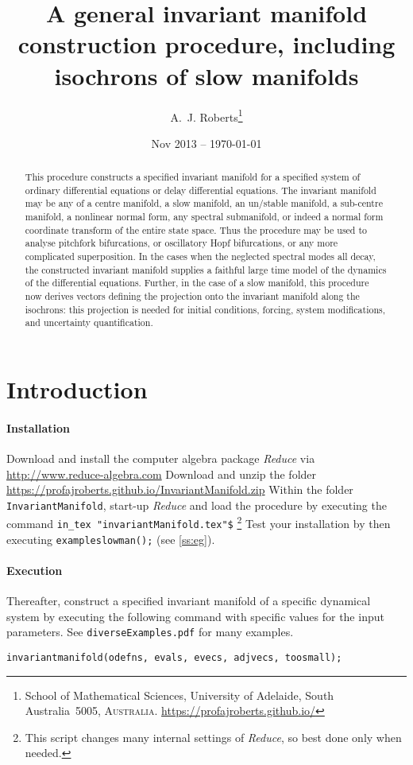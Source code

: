 \documentclass[11pt,a5paper]{article}
\title{A general invariant manifold construction procedure,
including isochrons of slow manifolds}
\author{A.~J. Roberts\thanks{School of Mathematical
Sciences, University of Adelaide, South Australia~5005,
\textsc{Australia}. \url{https://profajroberts.github.io/}}}
\date{Nov 2013 -- \today}
\begin{document}
\sloppy

\maketitle

\begin{abstract}
This procedure constructs a specified invariant manifold for
a specified system of ordinary differential equations or
delay differential equations. The invariant manifold may be
any of a centre manifold, a slow manifold, an un/stable
manifold, a sub-centre manifold, a nonlinear normal form,
any spectral submanifold, or indeed a normal form coordinate
transform of the entire state space. Thus the procedure may
be used to analyse pitchfork bifurcations, or oscillatory
Hopf bifurcations, or any more complicated superposition. In
the cases when the neglected spectral modes all decay, the
constructed invariant manifold supplies a faithful large
time model of the dynamics of the differential equations.
Further, in the case of a slow manifold, this procedure now
derives vectors defining the projection onto the invariant
manifold along the isochrons: this projection is needed for
initial conditions, forcing, system modifications, and
uncertainty quantification.
\end{abstract}

\tableofcontents



\section{Introduction}

\paragraph{Installation}
Download and install the computer algebra package
\emph{Reduce} via \url{http://www.reduce-algebra.com}\quad
Download and unzip the folder
\url{https://profajroberts.github.io/InvariantManifold.zip}
\quad Within the folder \verb|InvariantManifold|, start-up
\emph{Reduce} and load the procedure by executing the
command \verb|in_tex "invariantManifold.tex"$|
\footnote{This script changes many internal settings of
\emph{Reduce}, so best done only when needed.} Test your
installation by then executing \verb|exampleslowman();|
\quad(see \cref{ss:eg}).

\paragraph{Execution}
Thereafter, construct a specified invariant manifold of a
specific dynamical system by executing the following command
with specific values for the input parameters.  See
\verb|diverseExamples.pdf| for many examples.
\begin{verbatim}
invariantmanifold(odefns, evals, evecs, adjvecs, toosmall);
\end{verbatim}
\end{document}
